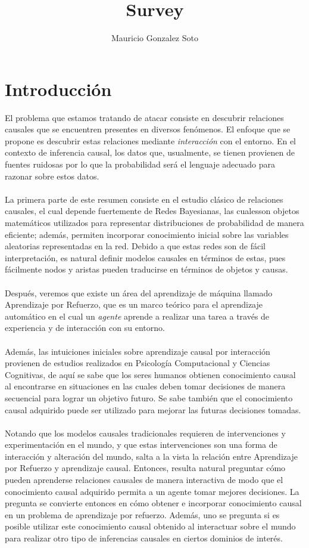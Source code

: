 \documentclass[11pt]{article}
\title{Survey}
\author{Mauricio Gonzalez Soto}
\theoremstyle{plain}
\begin{document}
\nocite{*}
\maketitle
\tableofcontents
\newpage
\section{Introducción}
El problema que estamos tratando de atacar consiste en descubrir relaciones causales que se encuentren presentes en diversos fenómenos. El enfoque que se propone es descubrir estas relaciones mediante \textit{interacción} con el entorno. En el contexto de inferencia causal, los datos que, usualmente, se tienen provienen de fuentes ruidosas por lo que la probabilidad será el lenguaje adecuado para razonar sobre estos datos.\\
\\
La primera parte de este resumen consiste en el estudio clásico de relaciones causales, el cual depende fuertemente de Redes Bayesianas, las cualesson objetos matemáticos utilizados para representar distribuciones de probabilidad de manera eficiente; además, permiten incorporar conocimiento inicial sobre las variables aleatorias representadas en la red. Debido a que estas redes son de fácil interpretación, es natural definir modelos causales en términos de estas, pues fácilmente nodos y aristas pueden traducirse en términos de objetos y causas.\\
\\
Después, veremos que existe un área del aprendizaje de máquina llamado Aprendizaje por Refuerzo, que es un marco teórico para el aprendizaje automático en el cual un \textit{agente} aprende a realizar una tarea a través de experiencia y de interacción con su entorno.\\
\\
Además, las intuiciones iniciales sobre aprendizaje causal por interacción provienen de estudios realizados en Psicología Computacional y Ciencias Cognitivas, de aquí se sabe que los seres humanos obtienen conocimiento causal al encontrarse en situaciones en las cuales deben tomar decisiones de manera secuencial para lograr un objetivo futuro. Se sabe también que el conocimiento causal adquirido puede ser utilizado para mejorar las futuras decisiones tomadas.\\
\\
Notando que los modelos causales tradicionales requieren de intervenciones y experimentación en el mundo, y que estas intervenciones son una forma de interacción y alteración del mundo, salta a la vista la relación entre Aprendizaje por Refuerzo y aprendizaje causal. Entonces, resulta natural preguntar cómo pueden aprenderse relaciones causales de manera interactiva de modo que el conocimiento causal adquirido permita a un agente tomar mejores decisiones. La pregunta se convierte entonces en cómo obtener e incorporar conocimiento causal en un problema de aprendizaje por refuerzo. Además, uno se pregunta si es posible utilizar este conocimiento causal obtenido al interactuar sobre el mundo para realizar otro tipo de inferencias causales en ciertos dominios de interés.
\end{document}
